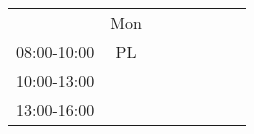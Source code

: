 \begin{table}[!h]
\begin{tabular}{cccccccc}
                                 & Mon                                             &                        &                                                &                        &                                                &                        &                        \\ \cline{2-2}
\multicolumn{1}{c|}{08:00-10:00} & \multicolumn{1}{c|}{\cellcolor[HTML]{FCFF2F}PL} &                        &                                                &                        &                                                &                        &                        \\ \cline{2-2}
\multicolumn{1}{c|}{10:00-13:00} & \multicolumn{1}{c|}{\cellcolor[HTML]{FCFF2F}}   &                        &                                                &                        &                                                &                        &                        \\ \cline{2-2}
\multicolumn{1}{c|}{13:00-16:00} & \multicolumn{1}{c|}{\cellcolor[HTML]{FCFF2F}}   &                        &                                                &                        &                                                &                        &                        \\ \cline{2-2}
\end{tabular}
\end{table}



